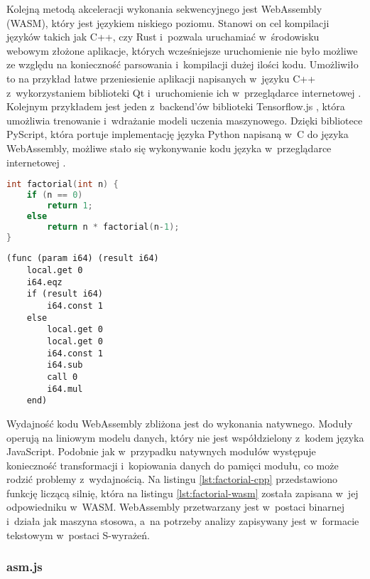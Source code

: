Kolejną metodą akceleracji wykonania sekwencyjnego jest WebAssembly (WASM), który jest językiem niskiego poziomu. Stanowi on cel kompilacji języków takich jak C++, czy Rust i~pozwala uruchamiać w~środowisku webowym złożone aplikacje, których wcześniejsze uruchomienie nie było możliwe ze względu na konieczność parsowania i~kompilacji dużej ilości kodu. Umożliwiło to na przykład łatwe przeniesienie aplikacji napisanych w~języku C++ z~wykorzystaniem biblioteki Qt i~uruchomienie ich w~przeglądarce internetowej \cite{qt-wasm}. Kolejnym przykładem jest jeden z~backend'ów biblioteki Tensorflow.js \cite{tensorflowjs}, która umożliwia trenowanie i~wdrażanie modeli uczenia maszynowego. Dzięki bibliotece PyScript, która portuje implementację języka Python napisaną w~C do języka WebAssembly, możliwe stało się wykonywanie kodu języka w~przeglądarce internetowej \cite{pyscript}.

\begin{lstlisting}[language=C++, caption=Funkcja licząca silnię w~języku C/C++, label=lst:factorial-cpp]
int factorial(int n) {
    if (n == 0)
        return 1;
    else
        return n * factorial(n-1);
}
\end{lstlisting}
    
\begin{lstlisting}[language=WASM, caption=Funkcja licząca silnię w~języku WASM, label=lst:factorial-wasm]
(func (param i64) (result i64)
    local.get 0
    i64.eqz
    if (result i64)
        i64.const 1
    else
        local.get 0
        local.get 0
        i64.const 1
        i64.sub
        call 0
        i64.mul
    end)
\end{lstlisting}

Wydajność kodu WebAssembly zbliżona jest do wykonania natywnego. Moduły operują na liniowym modelu danych, który nie jest współdzielony z~kodem języka JavaScript. Podobnie jak w~przypadku natywnych modułów występuje konieczność transformacji i~kopiowania danych do pamięci modułu, co może rodzić problemy z~wydajnością. Na listingu \ref{lst:factorial-cpp} przedstawiono funkcję liczącą silnię, która na listingu \ref{lst:factorial-wasm} została zapisana w~jej odpowiedniku w~WASM. WebAssembly przetwarzany jest w~postaci binarnej i~działa jak maszyna stosowa, a~na potrzeby analizy zapisywany jest w~formacie tekstowym w~postaci S-wyrażeń.

\subsubsection{asm.js}

